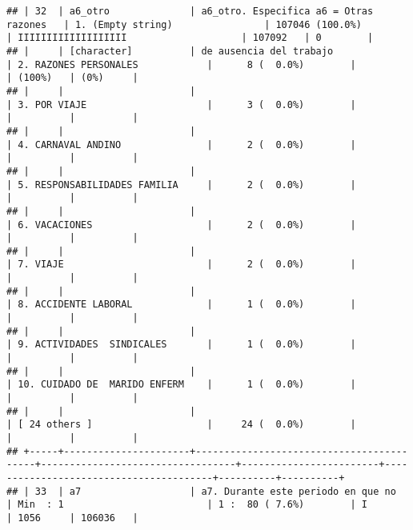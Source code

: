 \documentclass[]{article}
\begin{document}
\begin{verbatim}
## | 32  | a6_otro              | a6_otro. Especifica a6 = Otras razones   | 1. (Empty string)                | 107046 (100.0%)        | IIIIIIIIIIIIIIIIIII                    | 107092   | 0        |
## |     | [character]          | de ausencia del trabajo                  | 2. RAZONES PERSONALES            |      8 (  0.0%)        |                                        | (100%)   | (0%)     |
## |     |                      |                                          | 3. POR VIAJE                     |      3 (  0.0%)        |                                        |          |          |
## |     |                      |                                          | 4. CARNAVAL ANDINO               |      2 (  0.0%)        |                                        |          |          |
## |     |                      |                                          | 5. RESPONSABILIDADES FAMILIA     |      2 (  0.0%)        |                                        |          |          |
## |     |                      |                                          | 6. VACACIONES                    |      2 (  0.0%)        |                                        |          |          |
## |     |                      |                                          | 7. VIAJE                         |      2 (  0.0%)        |                                        |          |          |
## |     |                      |                                          | 8. ACCIDENTE LABORAL             |      1 (  0.0%)        |                                        |          |          |
## |     |                      |                                          | 9. ACTIVIDADES  SINDICALES       |      1 (  0.0%)        |                                        |          |          |
## |     |                      |                                          | 10. CUIDADO DE  MARIDO ENFERM    |      1 (  0.0%)        |                                        |          |          |
## |     |                      |                                          | [ 24 others ]                    |     24 (  0.0%)        |                                        |          |          |
## +-----+----------------------+------------------------------------------+----------------------------------+------------------------+----------------------------------------+----------+----------+
## | 33  | a7                   | a7. Durante este periodo en que no       | Min  : 1                         | 1 :  80 ( 7.6%)        | I                                      | 1056     | 106036   |

\end{verbatim}
\end{document}
